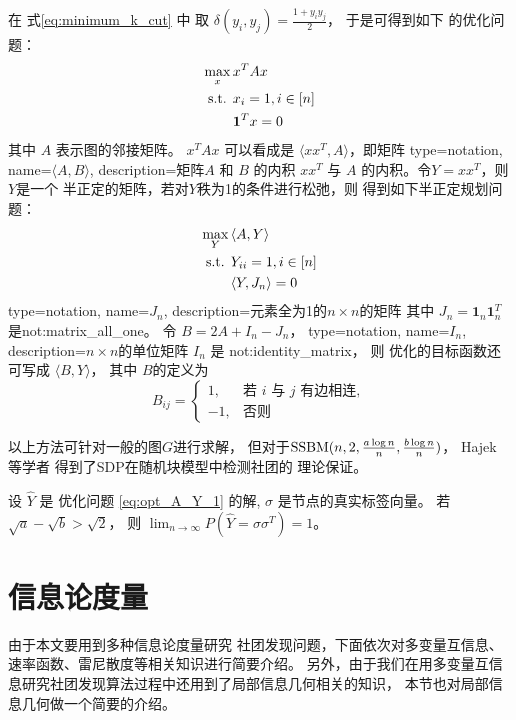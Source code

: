 在 式\eqref{eq:minimum_k_cut} 中
取 $\delta(y_i, y_j) = \frac{1+y_iy_j}{2}$，
于是可得到如下
的优化问题：
\begin{align}
  \max_x\, &  x^T A x \notag \\
  \textrm{s.t. } & x_{i} = 1, i \in [n] \notag \\
  & \mathbf{1}^T x = 0
\end{align}
其中 $A$ 表示图的邻接矩阵。
$ x^T A x $ 可以看成是 $\langle xx^T, A \rangle $，即矩阵
{
  type=notation,
  name={$\langle A, B \rangle $},
  description={矩阵$A$ 和 $B$ 的内积}
}
$xx^T$ 与 $A$ 的内积。令$Y=xx^T$，则$Y$是一个
半正定的矩阵，若对$Y$秩为1的条件进行松弛，则
得到如下半正定规划问题：
\begin{align}\label{eq:opt_A_Y_1}
  \max_Y\, & \langle A, Y \rangle  \notag \\
  \textrm{s.t. } & Y_{ii} = 1, i \in [n] \notag \\
  & \langle Y, J_n \rangle  = 0
\end{align}
{
  type=notation,
  name={$J_n$},
  description={元素全为1的$n\times n$的矩阵}
}
其中 $J_n=\mathbf{1}_n\mathbf{1}_n^T$
是\glsdesc{not:matrix_all_one}。
令 $B=2A + I_n - J_n$，
{
  type=notation,
  name={$I_n$},
  description={$n\times n$的单位矩阵}
}
$I_n$ 是 \glsdesc{not:identity_matrix}，
则
优化的目标函数还可写成 $ \langle B, Y \rangle $，
其中 $B$的定义为
\begin{equation}\label{eq:def_B_sdp}
    B_{ij} = \begin{cases}
        1, & \text{若 $i$ 与 $j$ 有边相连}, \\
        -1,& \text{否则}
    \end{cases}
\end{equation}  

以上方法可针对一般的图$G$进行求解，
但对于$\operatorname{SSBM}(n,2, \frac{a \log n}{n}, \frac{b \log n}{n})$，
Hajek 等学者 \cite{hajek2016achieving} 得到了SDP在随机块模型中检测社团的
理论保证。
\begin{theorem}
  设 $\hat{Y}$ 是
  优化问题 \eqref{eq:opt_A_Y_1} 的解, $\sigma$ 是节点的真实标签向量。
  若 $\sqrt{a} - \sqrt{b}
  > \sqrt{2}$，
  则
  $\lim_{n\to\infty} P(\hat{Y}=\sigma\sigma^T)=1$。
\end{theorem}
\section{信息论度量}
由于本文要用到多种信息论度量研究
社团发现问题，下面依次对多变量互信息、速率函数、雷尼散度等相关知识进行简要介绍。
另外，由于我们在用多变量互信息研究社团发现算法过程中还用到了局部信息几何相关的知识，
本节也对局部信息几何做一个简要的介绍。
